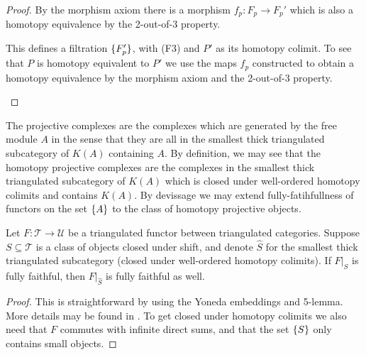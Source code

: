 \documentclass[../thesis.tex]{subfiles}
\begin{document}
\begin{proof}
                By the morphism axiom there is a morphism $f_p : F_p \rightarrow F_{p}'$ which is also a homotopy equivalence by the 2-out-of-3 property.

                This defines a filtration $\{F_p'\}$, with (F3) and $P'$ as its homotopy colimit. To see that $P$ is homotopy equivalent to $P'$ we use the maps $f_p$ constructed to obtain a homotopy equivalence by the morphism axiom and the 2-out-of-3 property.

                \begin{center}
                \end{center}
            \end{proof}

            The projective complexes are the complexes which are generated by the free module $A$ in the sense that they are all in the smallest thick triangulated subcategory of $K(A)$ containing $A$. By definition, we may see that the homotopy projective complexes are the complexes in the smallest thick triangulated subcategory of $K(A)$ which is closed under well-ordered homotopy colimits and contains $K(A)$. By devissage we may extend fully-fatihfullness of functors on the set $\{A\}$ to the class of homotopy projective objects.

            \begin{lemma}[Devissage]
                Let $F: \mathcal{T} \rightarrow \mathcal{U}$ be a triangulated functor between triangulated categories. Suppose $S\subseteq \mathcal{T}$ is a class of objects closed under shift, and denote $\widehat{S}$ for the smallest thick triangulated subcategory (closed under well-ordered homotopy colimits). If $F|_S$ is fully faithful, then $F|_{\widehat{S}}$ is fully faithful as well.
            \end{lemma}

            \begin{proof}
                This is straightforward by using the Yoneda embeddings and 5-lemma. More details may be found in \cite{Krause21}. To get closed under homotopy colimits we also need that $F$ commutes with infinite direct sums, and that the set $\{S\}$ only contains small objects.
            \end{proof}
\end{document}
